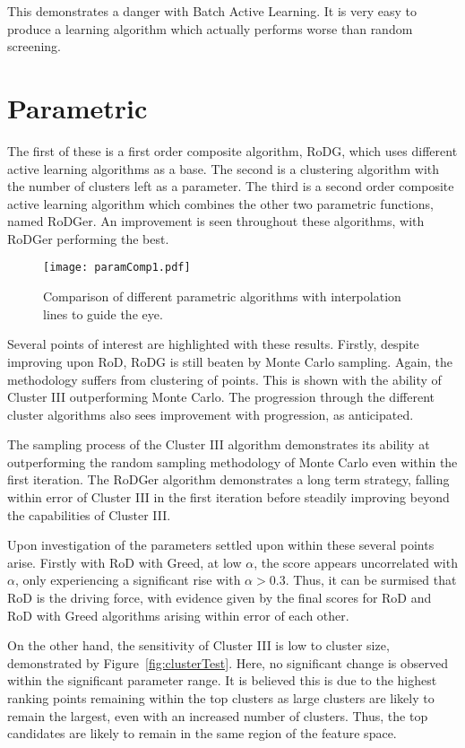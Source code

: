 This demonstrates a danger with Batch Active Learning. It is very easy to produce a learning algorithm which actually performs worse than random screening.

\section{Parametric}
The first of these is a first order composite algorithm, RoDG, which uses different active learning algorithms as a base. The second is a clustering algorithm with the number of clusters left as a parameter. The third is a second order composite active learning algorithm which combines the other two parametric functions, named RoDGer. An improvement is seen throughout these algorithms, with RoDGer performing the best.

\begin{figure}[h]
    \begin{center}
        \texttt{[image: paramComp1.pdf]}
        \caption[Parametric Comparison]{Comparison of different parametric algorithms with interpolation lines to guide the eye.}
        \label{fig:pComp}
    \end{center}
\end{figure}

Several points of interest are highlighted with these results. Firstly, despite improving upon RoD, RoDG is still beaten by Monte Carlo sampling. Again, the methodology suffers from clustering of points. This is shown with the ability of Cluster III outperforming Monte Carlo. The progression through the different cluster algorithms also sees improvement with progression, as anticipated.

The sampling process of the Cluster III algorithm demonstrates its ability at outperforming the random sampling methodology of Monte Carlo even within the first iteration. The RoDGer algorithm demonstrates a long term strategy, falling within error of Cluster III in the first iteration before steadily improving beyond the capabilities of Cluster III.

Upon investigation of the parameters settled upon within these several points arise. Firstly with RoD with Greed, at low $\alpha$, the score appears uncorrelated with $\alpha$, only experiencing a significant rise with $\alpha{}>0.3$. Thus, it can be surmised that RoD is the driving force, with evidence given by the final scores for RoD and RoD with Greed algorithms arising within error of each other.

On the other hand, the sensitivity of Cluster III is low to cluster size, demonstrated by Figure~\ref{fig:clusterTest}. Here, no significant change is observed within the significant parameter range. It is believed this is due to the highest ranking points remaining within the top clusters as large clusters are likely to remain the largest, even with an increased number of clusters. Thus, the top candidates are likely to remain in the same region of the feature space.

